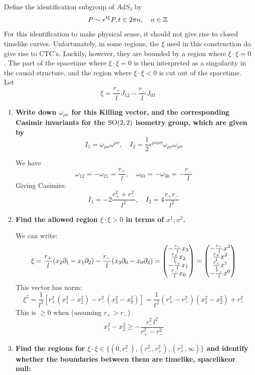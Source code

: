 \documentclass[11pt, class=article, crop=false]{standalone}
\begin{document}
\begin{enumerate}
	Define the identification subgroup of $AdS_3$ by 
	\[
		P \sim e^{t \xi} P, t \in 2 \pi n, \quad n \in \mathbb{Z}
	\]
	For this identification to make physical sense, it should not give rise to closed timelike curves. Unfortunately, in some regions, the $\xi$ used in this construction do give rise to CTC’s. Luckily, however, they are bounded by a region where $\xi \cdot \xi = 0$. The part of the spacetime where $\xi \cdot \xi = 0$ is then interpreted as a singularity in the causal structure, and the region where $\xi \cdot \xi < 0$ is cut out of the spacetime. Let
	\[
		\xi = \frac{r_+}{l} J_{12} - \frac{r_-}{l} J_{03}
	\]
	
	\begin{enumerate}
		\item \textbf{Write down $\omega_{\mu \nu}$ for this Killing vector, and the corresponding Casimir invariants for the $\mathrm{SO}(2,2)$ isometry group, which are given by}
		\[
			I_1= \omega_{\mu \nu} \omega^{\mu \nu}, \quad I_2 = \frac12 \epsilon^{\mu \nu \rho \sigma} \omega_{\mu \nu} \omega_{\rho \sigma}
		\]
		
		 We have 
		\[
			\omega_{12} = - \omega_{21} = \frac{r_+}{l}, \quad \omega_{03} = -\omega_{30} = - \frac{r_-}{l}
		\]
		Giving Casimirs:
		\[
			I_1 = -2 \frac{r_+^2 + r_-^2}{l^2}, \quad I_2 = 4 \frac{r_+ r_-}{l^2}
		\]
		\item \textbf{Find the allowed region $\xi \cdot \xi > 0$ in terms of $x^1, x^2$.}
		
		 We can write:
		\[
			\xi = \frac{r_+}{l} (x_2 \partial_1 - x_1 \partial_2) - \frac{r_-}{l} (x_3 \partial_0 - x_0 \partial_3) = \begin{pmatrix}
				-\frac{r_-}{l} x_3\\
				\frac{r_+}{l} x_2\\
				-\frac{r_+}{l} x_1\\
				\frac{r_-}{l} x_0
			\end{pmatrix} = \begin{pmatrix}
				-\frac{r_-}{l} x^3\\
				\frac{r_+}{l} x^2\\
				\frac{r_+}{l} x^1\\
				-\frac{r_-}{l} x^0
			\end{pmatrix}
		\]
		This vector has norm:
		\[
			\xi^2 = \frac{1}{l^2} [r_+^2 (x_1^2 - x_2^2) - r_-^2 ( x_3^2 - x_0^2)] = \frac{1}{\ell^2} (r_+^2 - r_-^2)(x_1^2 - x_2^2) + r_-^2
		\]
		This is $\geq 0$ when (assuming $r_+ > r_-$)
		\[
			x_1^2 - x_2^2 \geq - \frac{r_-^2 l^2}{r_+^2 - r_-^2}
		\]
		\item
		 \textbf{Find the regions for $\xi \cdot \xi \in \{(0, r_-^2), (r_-^2, r_+^2), (r_+^2, \infty) \}$ and identify whether the boundaries between them are timelike, spacelikeor null:}
		

\end{enumerate}
\end{enumerate}
\end{document}
